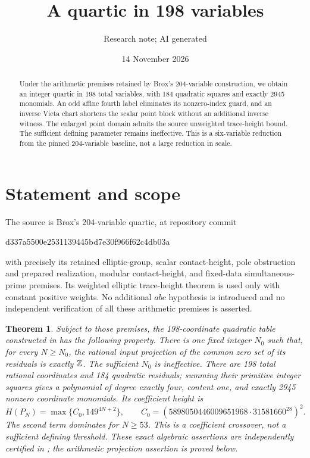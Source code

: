 \documentclass[11pt]{article}
\title{A quartic in 198 variables}
\author{Research note; AI generated}
\date{14 November 2026}
\newtheorem{theorem}{Theorem}
\begin{document}
\maketitle
\begin{abstract}
Under the arithmetic premises retained by Brox's 204-variable construction,
we obtain an integer quartic in 198 total variables, with 184 quadratic
squares and exactly 2945 monomials. An odd affine fourth label eliminates
its nonzero-index guard, and an inverse Vieta chart shortens the scalar
point block without an additional inverse witness. The enlarged point
domain admits the source unweighted trace-height bound. The sufficient
defining parameter remains ineffective. This is a six-variable reduction
from the pinned 204-variable baseline, not a large reduction in scale.
\end{abstract}

\section*{Statement and scope}
The source is Brox's 204-variable quartic, at repository commit
\begin{center}\small\ttfamily d337a5500e2531139445bd7e30f966f62c4db03a\end{center}
with precisely its
retained elliptic-group, scalar contact-height, pole obstruction and
prepared realization, modular contact-height, and fixed-data
simultaneous-prime premises. Its weighted elliptic trace-height theorem
is used only with constant positive weights. No additional $abc$
hypothesis is introduced and no independent verification of all these
arithmetic premises is asserted.

\begin{theorem}
Subject to those premises, the 198-coordinate quadratic table constructed
in  has the following property. There is one fixed
integer $N_0$ such that, for every $N\ge N_0$, the rational input
projection of the common zero set of its residuals is exactly $\mathbb Z$.
The sufficient $N_0$ is ineffective. There are 198 total rational
coordinates and 184 quadratic residuals; summing their primitive integer
squares gives a polynomial of degree exactly four, content one, and
exactly 2945 nonzero coordinate monomials. Its coefficient height is
\[
 H(P_N)=\max\{C_0,149^{4N+2}\},\qquad
 C_0=(5898050446009651968\cdot31581660^{28})^2.
\]
The second term dominates for $N\ge53$. This is a coefficient crossover,
not a sufficient defining threshold. These exact algebraic assertions
are independently certified in
;
the arithmetic projection assertion is proved below.
\end{theorem}
\end{document}

